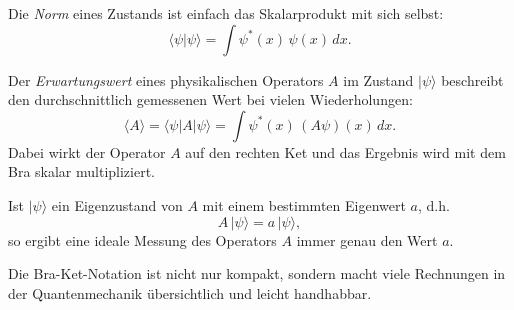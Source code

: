		Die \emph{Norm} eines Zustands ist einfach das Skalarprodukt mit sich selbst:
		\begin{equation}
		\langle \psi | \psi \rangle = \int \psi^*(x)\,\psi(x)\,dx.
		\end{equation}

		Der \emph{Erwartungswert} eines physikalischen Operators $A$ im Zustand $|\psi\rangle$ beschreibt den durchschnittlich gemessenen Wert bei vielen Wiederholungen:
		\begin{equation}
		\langle A \rangle = \langle \psi | A | \psi \rangle = \int \psi^*(x)\,(A\psi)(x)\,dx.
		\end{equation}
		Dabei wirkt der Operator $A$ auf den rechten Ket und das Ergebnis wird mit dem Bra skalar multipliziert.
		
		Ist $|\psi\rangle$ ein Eigenzustand von $A$ mit einem bestimmten Eigenwert $a$, d.h.
		\begin{equation}
		A\,|\psi\rangle = a\,|\psi\rangle,
		\end{equation}
		so ergibt eine ideale Messung des Operators $A$ immer genau den Wert $a$.

		Die Bra-Ket-Notation ist nicht nur kompakt, sondern macht viele Rechnungen in der Quantenmechanik übersichtlich und leicht handhabbar.


